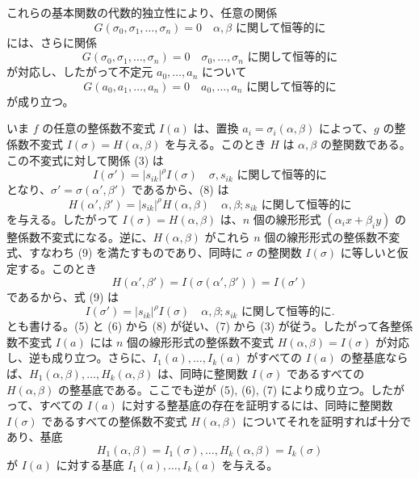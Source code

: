 \documentclass[11pt]{article}
\begin{document}
これらの基本関数の代数的独立性により、任意の関係
\begin{equation}
        G(\sigma_0,\sigma_1,\ldots,\sigma_n)=0
        \quad \text{\(\alpha,\beta\) に関して恒等的に}
\end{equation}
には、さらに関係
\begin{equation}
        G(\sigma_0,\sigma_1,\ldots,\sigma_n)=0
        \quad \text{\(\sigma_0,\ldots,\sigma_n\) に関して恒等的に}
\end{equation}
が対応し、したがって不定元 \(a_0,\ldots,a_n\) について
\begin{equation}
        G(a_0,a_1,\ldots,a_n)=0
        \quad \text{\(a_0,\ldots,a_n\) に関して恒等的に}
\end{equation}
が成り立つ。

いま \(f\) の任意の整係数不変式 \(I(a)\) は、置換 \(a_i=\sigma_i(\alpha,\beta)\) によって、\(g\) の整係数不変式 \(I(\sigma)=H(\alpha,\beta)\) を与える。このとき \(H\) は \(\alpha,\beta\) の整関数である。この不変式に対して関係 (3) は
\begin{equation}
        I(\sigma')=|s_{ik}|^\rho I(\sigma)
        \quad \text{\(\sigma,s_{ik}\) に関して恒等的に}
\end{equation}
となり、\(\sigma'=\sigma(\alpha',\beta')\) であるから、(8) は
\begin{equation}
        H(\alpha',\beta')=|s_{ik}|^\rho H(\alpha,\beta)
        \quad \text{\(\alpha,\beta;s_{ik}\) に関して恒等的に}
\end{equation}
を与える。したがって \(I(\sigma)=H(\alpha,\beta)\) は、\(n\) 個の線形形式 \((\alpha_i x+\beta_i y)\) の整係数不変式になる。逆に、\(H(\alpha,\beta)\) がこれら \(n\) 個の線形形式の整係数不変式、すなわち (9) を満たすものであり、同時に \(\sigma\) の整関数 \(I(\sigma)\) に等しいと仮定する。このとき
\[
        H(\alpha',\beta')=I(\sigma(\alpha',\beta'))=I(\sigma')
\]
であるから、式 (9) は
\begin{equation*}
        I(\sigma')=|s_{ik}|^\rho I(\sigma)
        \quad \text{\(\alpha,\beta;s_{ik}\) に関して恒等的に}.\tag{9a}
\end{equation*}
とも書ける。(5) と (6) から (8) が従い、(7) から (3) が従う。したがって各整係数不変式 \(I(a)\) には \(n\) 個の線形形式の整係数不変式 \(H(\alpha,\beta)=I(\sigma)\) が対応し、逆も成り立つ。さらに、\(I_1(a),\ldots,I_k(a)\) がすべての \(I(a)\) の整基底ならば、\(H_1(\alpha,\beta),\ldots,H_k(\alpha,\beta)\) は、同時に整関数 \(I(\sigma)\) であるすべての \(H(\alpha,\beta)\) の整基底である。ここでも逆が (5), (6), (7) により成り立つ。したがって、すべての \(I(a)\) に対する整基底の存在を証明するには、同時に整関数 \(I(\sigma)\) であるすべての整係数不変式 \(H(\alpha,\beta)\) についてそれを証明すれば十分であり、基底
\[
        H_1(\alpha,\beta)=I_1(\sigma),\ldots,H_k(\alpha,\beta)=I_k(\sigma)
\]
が \(I(a)\) に対する基底 \(I_1(a),\ldots,I_k(a)\) を与える。
\end{document}
